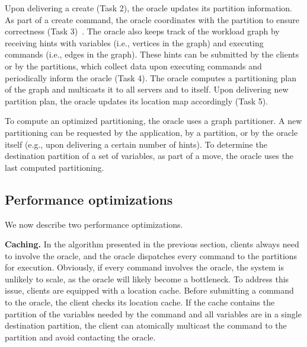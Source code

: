 Upon delivering a create (Task 2), the oracle updates its partition information.
As part of a create command, the oracle coordinates with the partition to ensure correctness (Task 3)~\cite{bezerra2014ssmr}.
%
The oracle also keeps track of the workload graph by receiving hints with variables (i.e., vertices in the graph) and executing commands (i.e., edges in the graph). These hints can be submitted by the clients or by the partitions, which collect data upon executing commands and periodically inform the oracle (Task 4).
The oracle computes a partitioning plan of the graph and multicasts it to all servers and to itself. Upon delivering new partition plan, the oracle updates its location map accordingly (Task 5).

To compute an optimized partitioning, the oracle uses a graph partitioner.
A new partitioning can be requested by the application, by a partition, or by the oracle itself (e.g., upon delivering a certain number of hints).
To determine the destination partition of a set of variables, as part of a move, the oracle uses 
the last computed partitioning.

\subsection{Performance optimizations}
\label{sec:optm}

We now describe two performance optimizations.

\textbf{Caching.} In the algorithm presented in the previous section, clients always need to involve the oracle, and the oracle dispatches every command to the partitions for execution.
Obviously, if every command involves the oracle, the system is unlikely to scale, as the oracle will likely become a bottleneck.
To address this issue, clients are equipped with a location cache.
Before submitting a command to the oracle, the client checks its location cache.
If the cache contains the partition of the variables needed by the command and all variables are in a single destination partition, the client can atomically multicast the command to the partition and avoid contacting the oracle. 

